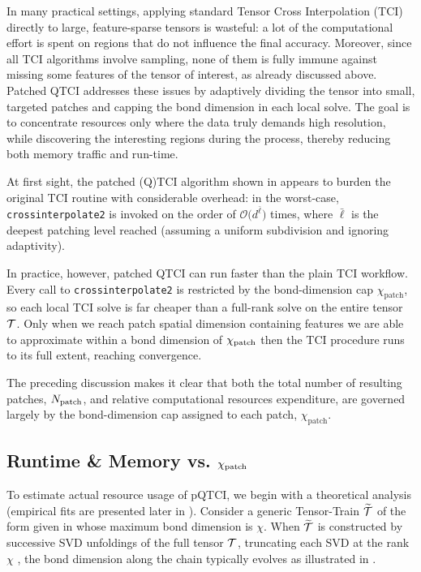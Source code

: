 In many practical settings, applying standard Tensor Cross Interpolation (TCI) directly to large, feature-sparse tensors is wasteful: a lot of the computational effort is spent on regions that do not influence the final accuracy. Moreover,
since all TCI algorithms involve sampling, none of them is fully immune against missing some features of the tensor of interest, as already discussed above. Patched QTCI addresses these issues by adaptively dividing the tensor into small, targeted patches and capping the bond dimension in each local solve. The goal is to concentrate resources only where the data truly demands high resolution, while discovering the interesting regions during the process, thereby reducing both memory traffic and run-time.

At first sight, the patched (Q)TCI algorithm shown in  appears to burden the original TCI routine with considerable overhead: in the worst-case, \texttt{crossinterpolate2} is invoked on the order of $\mathcal{O}\bigl(d^{\bar\ell}\bigr)$ times, where $\bar\ell$ is the deepest patching level reached (assuming a uniform subdivision and ignoring adaptivity).

In practice, however, patched QTCI can run faster than the plain TCI workflow. Every call to \texttt{crossinterpolate2} is restricted by the bond-dimension cap $\chi_{\text{patch}}$, so each local TCI solve is far cheaper than a full-rank solve on the entire tensor $\mathcal{T}$. Only when we reach patch spatial dimension containing features we are able to approximate within a bond dimension of $\chi_{\text{patch}}$ then the TCI procedure runs to its full extent, reaching convergence. 

The preceding discussion makes it clear that both the total number of resulting patches, $N_{\text{patch}}$, and relative computational resources expenditure, are governed largely by the bond-dimension cap assigned to each patch, $\chi_{\text{patch}}$. 

\subsection{Runtime \& Memory vs. $\chi_{\text{patch}}$}

To estimate actual resource usage of pQTCI, we begin with a theoretical analysis (empirical fits are presented later in ). 
Consider a generic Tensor-Train $\widetilde{\mathcal{T}}$ of the form given in  whose maximum bond dimension is $\chi$. When $\widetilde{\mathcal{T}}$ is constructed by successive SVD unfoldings of the full tensor $\mathcal{T}$, truncating each SVD at the rank $\chi$ \cite{vonDelftTNNotes, Fannes1992, tensornetwork.org}, the bond dimension along the chain typically evolves  as illustrated in .


